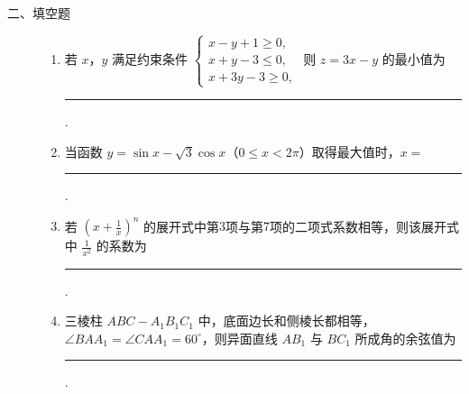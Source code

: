 \begin{description}

    \item[二、填空题]

    \begin{enumerate}[leftmargin=5pt]

      \addtocounter{enumi}{+12}

        \item 若 \(x\)，\(y\) 满足约束条件 \(\begin{cases}
x - y + 1 \geqslant 0,\\
x + y - 3 \leqslant 0,\\
x + 3y - 3 \geqslant 0,
\end{cases}\) 则 \(z = 3x - y\) 的最小值为\rule[-0.3ex]{3em}{0.4pt}.

        \item 当函数 \(y = \sin x - \sqrt{3}\cos x\)（\(0 \leqslant x < 2\pi\)）取得最大值时，\(x =\)\rule[-0.3ex]{3em}{0.4pt}.

        \item 若 \(\left(x + \frac{1}{x}\right)^n\) 的展开式中第\(3\)项与第\(7\)项的二项式系数相等，则该展开式中 \(\frac{1}{x^2}\) 的系数为\rule[-0.3ex]{3em}{0.4pt}.

        \item 三棱柱 \(ABC - A_{1}B_{1}C_{1}\) 中，底面边长和侧棱长都相等，\(\angle BAA_{1} = \angle CAA_{1} = 60^{\circ}\)，则异面直线 \(AB_{1}\) 与 \(BC_{1}\) 所成角的余弦值为\rule[-0.3ex]{3em}{0.4pt}.

    \end{enumerate}

\end{description}

